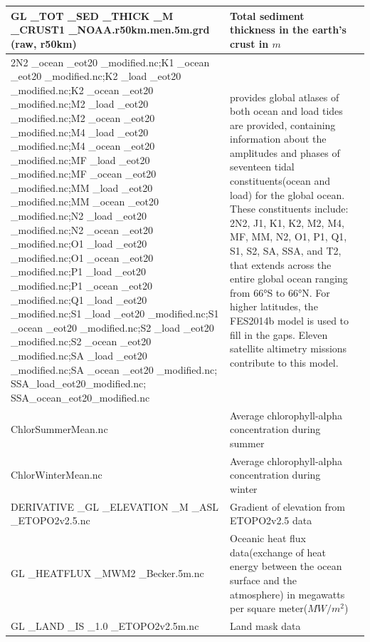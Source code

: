 \documentclass[journal abbreviation, manuscript]{copernicus}
\begin{document}
\begin{longtable}{|p{}|p{}|p{}|}
        \hline 
        GL \_TOT \_SED \_THICK \_M \_CRUST1 \_NOAA.r50km.men.5m.grd (raw, r50km) & Total sediment thickness in the earth's crust in $m$  & \cite{CRUST1_NOAA2013} \\
        \hline 2N2 \_ocean \_eot20 \_modified.nc;K1 \_ocean \_eot20 \_modified.nc;K2 \_load \_eot20 \_modified.nc;K2 \_ocean \_eot20 \_modified.nc;M2 \_load \_eot20 \_modified.nc;M2 \_ocean \_eot20 \_modified.nc;M4 \_load \_eot20 \_modified.nc;M4 \_ocean \_eot20 \_modified.nc;MF \_load \_eot20 \_modified.nc;MF \_ocean \_eot20 \_modified.nc;MM \_load \_eot20 \_modified.nc;MM \_ocean \_eot20 \_modified.nc;N2 \_load \_eot20 \_modified.nc;N2 \_ocean \_eot20 \_modified.nc;O1 \_load \_eot20 \_modified.nc;O1 \_ocean \_eot20 \_modified.nc;P1 \_load \_eot20 \_modified.nc;P1 \_ocean \_eot20 \_modified.nc;Q1 \_load \_eot20 \_modified.nc;S1 \_load \_eot20 \_modified.nc;S1 \_ocean \_eot20 \_modified.nc;S2 \_load \_eot20 \_modified.nc;S2 \_ocean \_eot20 \_modified.nc;SA \_load \_eot20 \_modified.nc;SA \_ocean \_eot20 \_modified.nc; SSA\_load\_eot20\_modified.nc; SSA\_ocean\_eot20\_modified.nc & \cite{HartDavis2021EOT20} provides global atlases of both ocean and load tides are provided, containing information about the amplitudes and phases of seventeen tidal constituents(ocean and load) for the global ocean. These constituents include: 2N2, J1, K1, K2, M2, M4, MF, MM, N2, O1, P1, Q1, S1, S2, SA, SSA, and T2, that extends across the entire global ocean ranging from 66°S to 66°N. For higher latitudes, the FES2014b model is used to fill in the gaps. Eleven satellite altimetry missions contribute to this model. & \cite{HartDavis2021EOT20} \\
        \hline 
        ChlorSummerMean.nc & Average chlorophyll-alpha concentration during summer &  \cite{nasaaqua}\\
        \hline 
        ChlorWinterMean.nc & Average chlorophyll-alpha concentration during winter &  \cite{nasaaqua}\\
        \hline 
        DERIVATIVE \_GL \_ELEVATION \_M \_ASL \_ETOPO2v2.5.nc & Gradient of elevation from ETOPO2v2.5 data &  \\
        \hline 
        GL \_HEATFLUX \_MWM2 \_Becker.5m.nc & Oceanic heat flux data(exchange of heat energy between the ocean surface and the atmosphere) in megawatts per square meter($MW/m^2$) & \cite{becker2014} \\
        \hline
        GL \_LAND \_IS \_1.0 \_ETOPO2v2.5m.nc & Land mask data & \cite{ETOPO2v22006} \\

\end{longtable}
\end{document}
